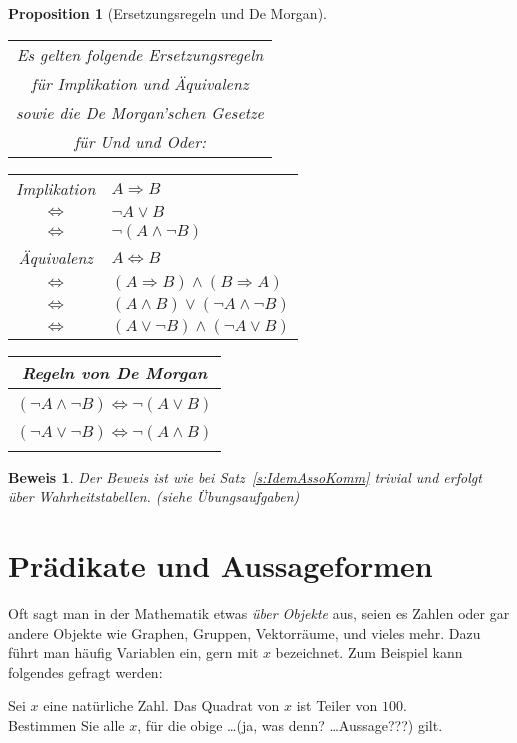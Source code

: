 \documentclass[a4paper]{article}
\newtheorem{proposition}[satz]{Proposition}
\theoremstyle{nonumberplain}
\newtheorem{beweis}{Beweis}
\begin{document}
\begin{proposition}[Ersetzungsregeln und De Morgan] \hspace{1cm} 

\begin{center}
\begin{tabular}{c}
Es gelten folgende Ersetzungsregeln \\
für Implikation und Äquivalenz\\
sowie die De Morgan'schen Gesetze\\
für Und und Oder:
\end{tabular}
\begin{tabular}{|c l|}
	\hline
	Implikation & $A \Rightarrow B$ \\
	$\Leftrightarrow$ & $\neg A \lor B$\\
	$\Leftrightarrow$ & $\neg (A \land \neg B)$\\
	\hline
	Äquivalenz & $A \Leftrightarrow B$\\
	$\Leftrightarrow$ & $(A \Rightarrow B) \land (B \Rightarrow A)$\\
	$\Leftrightarrow$ & $(A \land B) \lor (\neg A \land \neg B)$\\
	$\Leftrightarrow$ & $(A \lor \neg B) \land (\neg A \lor B)$\\	
	\hline
\end{tabular}
\begin{tabular}{|c|}
	\hline
	Regeln von De Morgan \\
	\hline
	\\
	$(\neg A \land \neg B) \Leftrightarrow \neg (A \lor B)$\\
	\\
	$(\neg A \lor \neg B) \Leftrightarrow \neg (A \land B)$\\
	\\
	\hline
\end{tabular}
\end{center}

\end{proposition}

\begin{beweis}
Der Beweis ist wie bei Satz~\ref{s:IdemAssoKomm} trivial und erfolgt über Wahrheitstabellen. \textit{(siehe Übungsaufgaben)}
\end{beweis}


\section{Prädikate und Aussageformen}
Oft sagt man in der Mathematik etwas \textit{über Objekte} aus, seien es Zahlen oder gar andere Objekte wie Graphen, Gruppen, Vektorräume, und vieles mehr. Dazu führt man häufig Variablen ein, gern mit $x$ bezeichnet. Zum Beispiel kann folgendes gefragt werden:
\begin{center}
Sei $x$ eine natürliche Zahl. Das Quadrat von $x$ ist Teiler von $100$.\\
Bestimmen Sie alle $x$, für die obige \dots (ja, was denn? \dots Aussage???) gilt.
\end{center}
\end{document}
